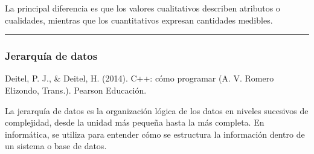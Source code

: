 \documentclass[letterpaper,10pt,spanish]{sphinxmanual}
\begin{document}
\sphinxAtStartPar
La principal diferencia es que los valores cualitativos describen atributos o cualidades, mientras que los cuantitativos expresan cantidades medibles.


\bigskip\hrule\bigskip



\subsubsection{Jerarquía de datos}
\label{\detokenize{1_guias/10programacion/G1022:jerarquia-de-datos}}
\sphinxAtStartPar
%
\begin{footnote}[2]\sphinxAtStartFootnote
Deitel, P. J., \& Deitel, H. (2014). C++: cómo programar (A. V. Romero Elizondo, Trans.). Pearson Educación.
%
\end{footnote} La jerarquía de datos es la organización lógica de los datos en niveles sucesivos de complejidad, desde la unidad más pequeña hasta la más completa. En informática, se utiliza para entender cómo se estructura la información dentro de un sistema o base de datos.
\end{document}
